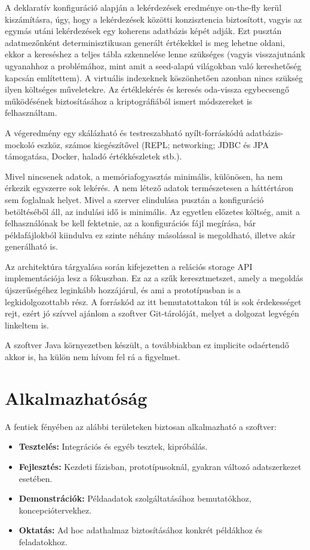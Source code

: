 \documentclass[
    parspace,
    noindent,
    nohyp,
]{elteiktdk}[2023/04/10]
\begin{document}
A deklaratív konfiguráció alapján a lekérdezések eredménye on-the-fly kerül kiszámításra,
úgy, hogy a lekérdezések közötti konzisztencia biztosított,
vagyis az egymás utáni lekérdezések egy koherens adatbázis képét adják.
Ezt pusztán adatmezőnként determinisztikusan generált értékekkel is meg lehetne oldani,
ekkor a kereséshez a teljes tábla szkennelése lenne szükséges
(vagyis visszajutnánk ugyanahhoz a problémához,
mint amit a seed-alapú világokban való kereshetőség kapcsán említettem).
A virtuális indexeknek köszönhetően azonban nincs szükség ilyen költséges műveletekre.
Az értéklekérés és keresés oda-vissza egybecsengő működésének
biztosításához a kriptográfiából ismert módszereket is felhasználtam.

A végeredmény egy skálázható és testreszabható nyílt-forráskódú adatbázis-mockoló eszköz,
számos kiegészítővel
(REPL; networking; JDBC és JPA támogatása, Docker, haladó értékkészletek stb.).

Mivel nincsenek adatok, a memóriafogyasztás minimális,
különösen, ha nem érkezik egyszerre sok lekérés.
A nem létező adatok természetesen a háttértáron sem foglalnak helyet.
Mivel a szerver elindulása pusztán a konfiguráció betöltéséből áll,
az indulási idő is minimális.
Az egyetlen előzetes költség, amit a felhasználónak be kell fektetnie,
az a konfigurációs fájl megírása,
bár példafájlokból kiindulva ez szinte néhány másolással is megoldható,
illetve akár generálható is.

Az architektúra tárgyalása során kifejezetten a relációs storage API implementációja lesz a fókuszban.
Ez az a szűk keresztmetszet, amely a megoldás újszerűségéhez leginkább hozzájárul,
és ami a prototípusban is a legkidolgozottabb rész.
A forráskód az itt bemutatottakon túl is sok érdekességet rejt,
ezért jó szívvel ajánlom a szoftver Git-tárolóját,
melyet a dolgozat legvégén linkeltem is.

A szoftver Java környezetben készült,
a továbbiakban ez implicite odaértendő akkor is,
ha külön nem hívom fel rá a figyelmet.

\section{Alkalmazhatóság}

A fentiek fényében az alábbi területeken biztosan alkalmazható a szoftver:

\begin{itemize}
    \setlength\itemsep{-0.4em}
    \item \textbf{Tesztelés:} Integrációs és egyéb tesztek, kipróbálás.
    \item \textbf{Fejlesztés:} Kezdeti fázisban, prototípusoknál, gyakran változó adatszerkezet esetében.
    \item \textbf{Demonstrációk:} Példaadatok szolgáltatásához bemutatókhoz, koncepciótervekhez.
    \item \textbf{Oktatás:} Ad hoc adathalmaz biztosításához konkrét példákhoz és feladatokhoz.
\end{itemize}
\end{document}
